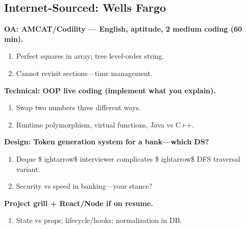 \documentclass[9pt,a4paper]{article}
\begin{document}
\subsection{Internet-Sourced: Wells Fargo}
\textbf{OA: AMCAT/Codility --- English, aptitude, 2 medium coding (60 min).}
\begin{enumerate}[label=\textit{Probe \arabic*:}]
  \item Perfect squares in array; tree level-order string.
  \item Cannot revisit sections---time management.
\end{enumerate}
\vspace{2mm}
\textbf{Technical: OOP live coding (implement what you explain).}
\begin{enumerate}[label=\textit{Probe \arabic*:}]
  \item Swap two numbers three different ways.
  \item Runtime polymorphism, virtual functions, Java vs C++.
\end{enumerate}
\vspace{2mm}
\textbf{Design: Token generation system for a bank---which DS?}
\begin{enumerate}[label=\textit{Probe \arabic*:}]
  \item Deque \$
ightarrow\$ interviewer complicates \$
ightarrow\$ DFS traversal variant.
  \item Security vs speed in banking---your stance?
\end{enumerate}
\vspace{2mm}
\textbf{Project grill + React/Node if on resume.}
\begin{enumerate}[label=\textit{Probe \arabic*:}]
  \item State vs props; lifecycle/hooks; normalization in DB.
\end{enumerate}
\vspace{2mm}
\end{document}
